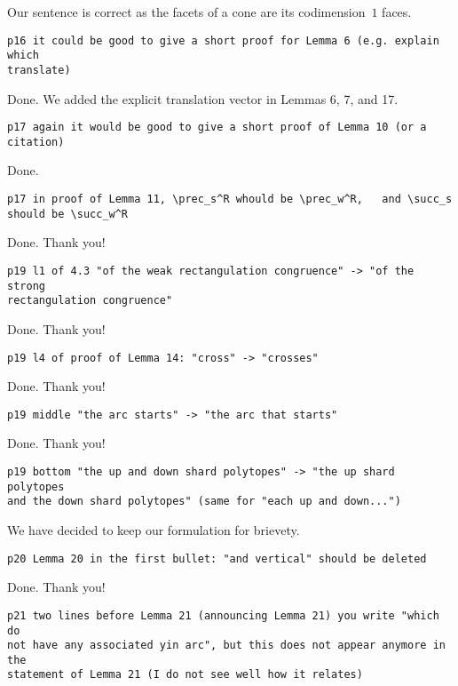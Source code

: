 \documentclass{article}
\begin{document}
Our sentence is correct as the facets of a cone are its codimension~$1$ faces.

\begin{verbatim}
p16 it could be good to give a short proof for Lemma 6 (e.g. explain which 
translate)
\end{verbatim}

Done. We added the explicit translation vector in Lemmas 6, 7, and 17.

\begin{verbatim}
p17 again it would be good to give a short proof of Lemma 10 (or a citation)
\end{verbatim}

Done.

\begin{verbatim}
p17 in proof of Lemma 11, \prec_s^R whould be \prec_w^R,   and \succ_s 
should be \succ_w^R
\end{verbatim}

Done. Thank you!

\begin{verbatim}
p19 l1 of 4.3 "of the weak rectangulation congruence" -> "of the strong 
rectangulation congruence"
\end{verbatim}

Done. Thank you!

\begin{verbatim}
p19 l4 of proof of Lemma 14: "cross" -> "crosses"
\end{verbatim}

Done. Thank you!

\begin{verbatim}
p19 middle "the arc starts" -> "the arc that starts"
\end{verbatim}

Done. Thank you!

\begin{verbatim}
p19 bottom "the up and down shard polytopes" -> "the up shard polytopes 
and the down shard polytopes" (same for "each up and down...")
\end{verbatim}

We have decided to keep our formulation for brievety.

\begin{verbatim}
p20 Lemma 20 in the first bullet: "and vertical" should be deleted
\end{verbatim}

Done. Thank you!

\begin{verbatim}
p21 two lines before Lemma 21 (announcing Lemma 21) you write "which do 
not have any associated yin arc", but this does not appear anymore in the 
statement of Lemma 21 (I do not see well how it relates)
\end{verbatim}
\end{document}
